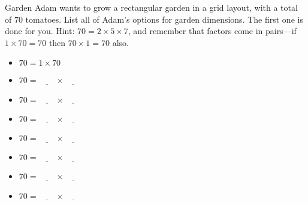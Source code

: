 \documentclass[12pt,letterpaper]{article}
\makeatletter
\newenvironment{problem}{\@startsection
       {section}
       {1}
       {-.2em}
       {-3.5ex plus -1ex minus -.2ex}
       {2.3ex plus .2ex}
       {\pagebreak[3]
       \large\bf\noindent{Problem }
       }
       }
\makeatother
\begin{document}
\begin{problem}{Garden}
 Adam wants to grow a rectangular garden in a grid layout, with a total
 of $70$ tomatoes. List all of Adam's options for garden dimensions.
 The first one is done for you. Hint: $70=2\times5\times7$, and remember
 that factors come in pairs---if $1 \times 70 = 70$ then $70 \times 1 = 70$
 also.
 
 \begin{itemize}
  \item $70 = 1 \times 70$
  \item $70 = \underline{\hspace{2em}} \times \underline{\hspace{2em}}$
  \item $70 = \underline{\hspace{2em}} \times \underline{\hspace{2em}}$
  \item $70 = \underline{\hspace{2em}} \times \underline{\hspace{2em}}$
  \item $70 = \underline{\hspace{2em}} \times \underline{\hspace{2em}}$
  \item $70 = \underline{\hspace{2em}} \times \underline{\hspace{2em}}$
  \item $70 = \underline{\hspace{2em}} \times \underline{\hspace{2em}}$
  \item $70 = \underline{\hspace{2em}} \times \underline{\hspace{2em}}$
 \end{itemize}

\end{problem}
\end{document}

